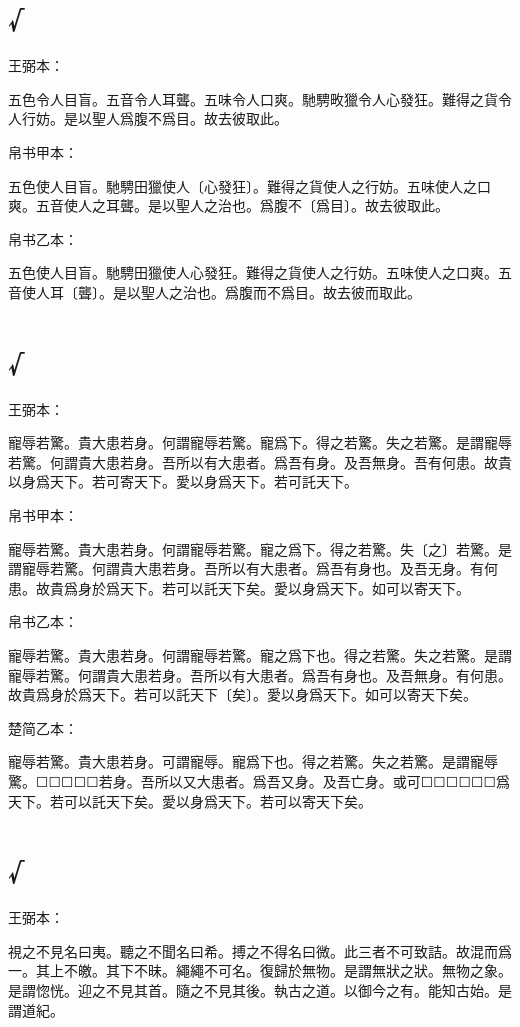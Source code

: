 \documentclass[a5paper]{ctexbook}
\begin{document}
    \chapter{√}
    王弼本：

    五色令人目盲。五音令人耳聾。五味令人口爽。馳騁畋獵令人心發狂。難得之貨令人行妨。是以聖人爲腹不爲目。故去彼取此。

    
    帛书甲本：

    五色使人目盲。馳騁田獵使人〔心發狂〕。難得之貨使人之行妨。五味使人之口爽。五音使人之耳聾。是以聖人之治也。爲腹不〔爲目〕。故去彼取此。

    帛书乙本：

    五色使人目盲。馳騁田獵使人心發狂。難得之貨使人之行妨。五味使人之口爽。五音使人耳〔聾〕。是以聖人之治也。爲腹而不爲目。故去彼而取此。

    \chapter{√}
    王弼本：

    寵辱若驚。貴大患若身。何謂寵辱若驚。寵爲下。得之若驚。失之若驚。是謂寵辱若驚。何謂貴大患若身。吾所以有大患者。爲吾有身。及吾無身。吾有何患。故貴以身爲天下。若可寄天下。愛以身爲天下。若可託天下。

    
    帛书甲本：

    寵辱若驚。貴大患若身。何謂寵辱若驚。寵之爲下。得之若驚。失〔之〕若驚。是謂寵辱若驚。何謂貴大患若身。吾所以有大患者。爲吾有身也。及吾无身。有何患。故貴爲身於爲天下。若可以託天下矣。愛以身爲天下。如可以寄天下。

    帛书乙本：

    寵辱若驚。貴大患若身。何謂寵辱若驚。寵之爲下也。得之若驚。失之若驚。是謂寵辱若驚。何謂貴大患若身。吾所以有大患者。爲吾有身也。及吾無身。有何患。故貴爲身於爲天下。若可以託天下〔矣〕。愛以身爲天下。如可以寄天下矣。

    楚简乙本：

    寵辱若驚。貴大患若身。可謂寵辱。寵爲下也。得之若驚。失之若驚。是謂寵辱驚。☐☐☐☐☐若身。吾所以又大患者。爲吾又身。及吾亡身。或可☐☐☐☐☐☐爲天下。若可以託天下矣。愛以身爲天下。若可以寄天下矣。

    \chapter{√}
    王弼本：

    視之不見名曰夷。聽之不聞名曰希。搏之不得名曰微。此三者不可致詰。故混而爲一。其上不皦。其下不昧。繩繩不可名。復歸於無物。是謂無狀之狀。無物之象。是謂惚恍。迎之不見其首。隨之不見其後。執古之道。以御今之有。能知古始。是謂道紀。
\end{document}
